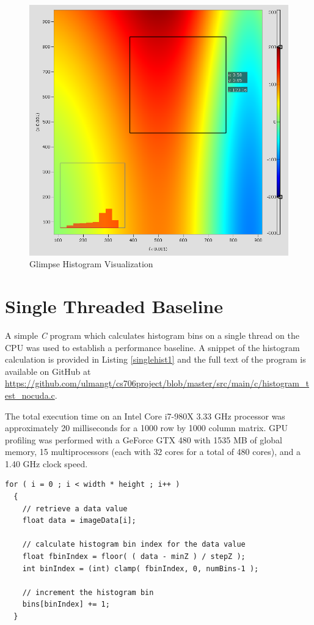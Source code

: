 \documentclass{article}
\begin{document}
\begin{figure}
\centering
\includegraphics[width=1.0\textwidth]{screenshots/glimpse/GlimpseHistogramPlot.png}
\caption{Glimpse Histogram Visualization}
\label{histogram1}
\end{figure}

\section{Single Threaded Baseline}\label{baseline}

A simple \emph{C} program which calculates histogram bins on a single thread on the CPU was used to establish a performance baseline. A snippet of the histogram calculation is provided in Listing \ref{singlehist1} and the full text of the program is available on GitHub at \url{https://github.com/ulmangt/cs706project/blob/master/src/main/c/histogram_test_nocuda.c}.

The total execution time on an Intel Core i7-980X 3.33 GHz processor was approximately 20 milliseconds for a 1000 row by 1000 column matrix. GPU profiling was performed with a GeForce GTX 480 with 1535 MB of global memory, 15 multiprocessors (each with 32 cores for a total of 480 cores), and a 1.40 GHz clock speed\cite{geforce480}.

\lstset{language=C,basicstyle=\footnotesize}
\begin{minipage}{\textwidth}
\begin{lstlisting}[caption={Single Threaded Histogram Calculation},label={singlehist1}]
  for ( i = 0 ; i < width * height ; i++ )
  {
    // retrieve a data value
    float data = imageData[i];

    // calculate histogram bin index for the data value
    float fbinIndex = floor( ( data - minZ ) / stepZ );
    int binIndex = (int) clamp( fbinIndex, 0, numBins-1 );

    // increment the histogram bin
    bins[binIndex] += 1;
  }
\end{lstlisting}
\end{minipage}
\end{document}
